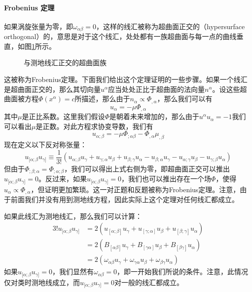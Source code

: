 \documentclass[hyperref, UTF8, a4paper]{ctexart}
\begin{document}
\paragraph{Frobenius 定理}

如果涡旋张量为零，即$\omega _{\alpha \beta } =0$，这样的线汇被称为超曲面正交的（hypersurface orthogonal）的，意思是对于这个线汇，处处都有一族超曲面与每一点的曲线垂直，如图\ref{hypersurface orthogonal}所示。

\begin{figure}
	\centering
	
	\caption{与测地线汇正交的超曲面族}
	\label{hypersurface orthogonal}
\end{figure}


这被称为Frobenius定理。下面我们给出这个定理证明的一些步骤。如果一个线汇是超曲面正交的，那么其切向量$u^{\alpha }$应当处处正比于超曲面的法向量$n^{\alpha }$。设这些超曲面被方程$\Phi (x^{\alpha } )=c$所描述，那么由于$n_{\alpha } \varpropto \Phi _{,\alpha }$，那么我们可以有
\begin{equation*}
	u_{\alpha } =-\mu \Phi _{,\alpha }
\end{equation*}
其中$\mu $是正比系数。这里我们假设$\Phi $是朝着未来增加的，那么由于$u^{\alpha } u_{\alpha } =-1$我们可以看出$\mu $是正数。对此方程求协变导数，我们有
\begin{equation*}
	u_{\alpha ;\beta } =-\mu \Phi _{;\alpha \beta } -\Phi _{,\alpha } \mu _{,\beta }
\end{equation*}
现在定义以下反对称张量：
\begin{equation*}
	u_{[ \alpha ;\beta } u_{\gamma ]} \equiv \frac{1}{3!}( u_{\alpha ;\beta } u_{\gamma } +u_{\gamma ;\alpha } u_{\beta } +u_{\beta ;\gamma } u_{\alpha } -u_{\beta ;\alpha } u_{\gamma } -u_{\alpha ;\gamma } u_{\beta } -u_{\gamma ;\beta } u_{\alpha })
\end{equation*}
但由于$\Phi _{;\beta ;\alpha } =\Phi _{;\alpha ;\beta }$，我们可以得出上式右侧为零，即超曲面正交可以推出$u_{[ \alpha ;\beta } u_{\gamma ]} =0$。反过来，如果$u_{[ \alpha ;\beta } u_{\gamma ]} =0$，我们也可以推出存在一个场$\Phi $，使得$u_{\alpha } \varpropto \Phi _{,\alpha }$，但证明更加繁琐。这一对正题和反题被称为Frobenius定理。注意，由于前面我们并没有用到测地线方程，因此实际上这个定理对任何线汇都成立。

如果此线汇为测地线汇，那么我们可以计算：
\begin{equation*}
	\begin{aligned}
		3!u_{[ \alpha ;\beta } u_{\gamma ]} & =2( u_{[ \alpha ;\beta ]} u_{\gamma } +u_{[ \gamma ;\alpha ]} u_{\beta } +u_{[ \beta ;\gamma ]} u_{\alpha })\\
		& =2( B_{[ \alpha \beta ]} u_{\gamma } +B_{[ \gamma \alpha ]} u_{\beta } +B_{[ \beta \gamma ]} u_{\alpha })\\
		& =2( \omega _{\alpha \beta } u_{\gamma } +\omega _{\gamma \alpha } u_{\beta } +\omega _{\beta \gamma } u_{\alpha })
	\end{aligned}
\end{equation*}
如果$u_{[ \alpha ;\beta } u_{\gamma ]} =0$，我们显然有$\omega _{\alpha \beta } =0$，即一开始我们所说的条件。注意，此情况仅对类时测地线成立，而$u_{[ \alpha ;\beta } u_{\gamma ]} =0$对一般的线汇都成立。
\end{document}
